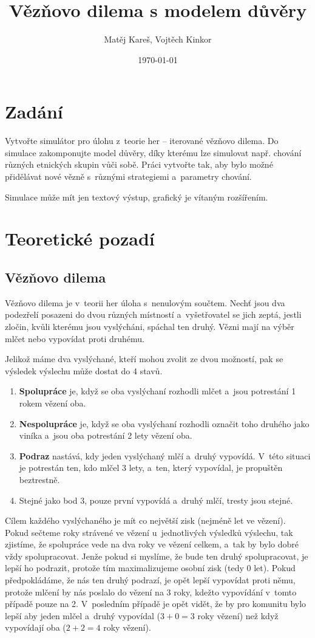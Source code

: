 \documentclass[pdftex,a4paper,12pt]{extarticle}
\title{Vězňovo dilema s modelem důvěry}
\author{Matěj Kareš, Vojtěch Kinkor}
\date{\today}
\begin{document}


\newpage
\tableofcontents
\newpage

\section{Zadání}
\label{zadani}
Vytvořte simulátor pro úlohu z~teorie her -- iterované vězňovo dilema. Do simulace zakomponujte model důvěry, díky kterému lze simulovat např. chování různých etnických skupin vůči sobě. Práci vytvořte tak, aby bylo možné přidělávat nové vězně s~různými strategiemi a~parametry chování.

Simulace může mít jen textový výstup, grafický je vítaným rozšířením.

\newpage
\section{Teoretické pozadí}
\label{Teoretické pozadí}

\subsection{Vězňovo dilema}
\label{Vězňovo dilema}
Vězňovo dilema je v~teorii her úloha s~nenulovým součtem. Nechť jsou dva podezřelí posazeni do dvou různých místností a~vyšetřovatel se jich zeptá, jestli zločin, kvůli kterému jsou vyslýcháni, spáchal ten druhý. Vězni mají na výběr mlčet nebo vypovídat proti druhému. 

Jelikož máme dva vyslýchané, kteří mohou zvolit ze dvou možností, pak se výsledek výslechu může dostat do 4 stavů. 

\begin{enumerate}
\item \textbf{Spolupráce} je, když se oba vyslýchaní rozhodli mlčet a~jsou potrestání 1 rokem vězení oba.
\item \textbf{Nespolupráce} je, když se oba vyslýchaní rozhodli označit toho druhého jako viníka a~jsou oba potrestání 2 lety vězení oba.
\item \textbf{Podraz} nastává, kdy jeden vyslýchaný mlčí a~druhý vypovídá. V~této situaci je potrestán ten, kdo mlčel 3 lety, a~ten, který vypovídal, je propuštěn beztrestně.
\item Stejné jako bod 3, pouze první vypovídá a~druhý mlčí, tresty jsou stejné.
\end{enumerate}

Cílem každého vyslýchaného je mít co největší zisk (nejméně let ve vězení). Pokud sečteme roky strávené ve vězení u~jednotlivých výsledků výslechu, tak zjistíme, že spolupráce vede na dva roky ve vězení celkem, a~tak by bylo dobré vždy spolupracovat. Jenže pokud si myslíme, že bude ten druhý spolupracovat, je lepší ho podrazit, protože tím maximalizujeme osobní zisk (tedy 0 let). Pokud předpokládáme, že nás ten druhý podrazí, je opět lepší vypovídat proti němu, protože mlčení by nás poslalo do vězení na 3 roky, kdežto vypovídání v~tomto případě pouze na 2. V~posledním případě je opět vidět, že by pro komunitu bylo lepší aby jeden mlčel a~druhý vypovídal ($3 + 0 = 3$ roky vězení) než když vypovídají oba ($2 + 2 = 4$ roky vězení).
\end{document}
